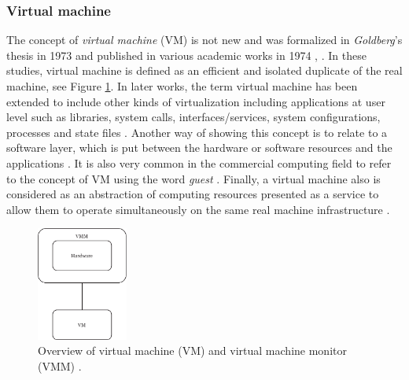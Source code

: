 	\subsubsection{Virtual machine}
	
	The concept of \textit{virtual machine} (VM) is not new and was formalized in \textit{Goldberg}'s thesis in 1973 \cite {Goldberg1973} and published in various academic works in 1974 \cite{Popek1974}, \cite{Goldberg1974}. In these studies, virtual machine is defined as an efficient and isolated duplicate of the real machine, see Figure \ref{fig:TheVirtualMachineMonitor_Popek1974}. In later works, the term virtual machine has been extended to include other kinds of virtualization including applications at user level such as libraries, system calls, interfaces/services, system configurations, processes and state files \cite{Chiueh2005}. Another way of showing this concept is to relate to a software layer, which is put between the hardware or software resources and the applications \cite{Solis2014}. It is also very common in the commercial computing field to refer to the concept of VM using the word \textit{guest} \cite{VMware2008}. Finally, a virtual machine also is considered as an abstraction of computing resources presented as a service to allow them to operate simultaneously on the same real machine infrastructure \cite{Pek2013}.


	\begin{figure}[H]
		\centering
		\includegraphics[width=3cm]{images/TheVirtualMachineMonitor_Popek1974.pdf}
		\vspace{0.2mm}
		\caption{Overview of virtual machine (VM) and virtual machine monitor (VMM) \cite{Popek1974}. }
		\label{fig:TheVirtualMachineMonitor_Popek1974}
	\end{figure}
	
